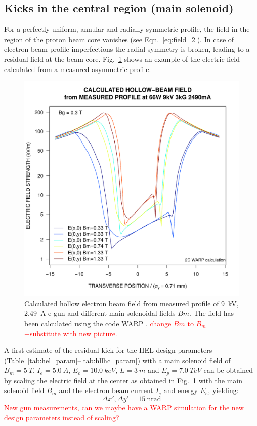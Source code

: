 \documentclass[%
 reprint,
 amsmath,amssymb,
 aps,
prstab,
]{revtex4-1}
\newcommand{\q}[2]{\ensuremath{#1\ \mathrm{#2}}} %
\begin{document}
\subsection{Kicks in the central region (main solenoid)}
\label{core:sec:2}
For a perfectly uniform, annular and radially symmetric profile, the field in the region of the proton beam core vanishes (see Eqn.~\ref{eq:field_2}). In case of electron beam profile imperfections the radial symmetry is broken, leading to a residual field at the beam core. Fig.~\ref{core:fig:1} shows an example of the electric field calculated from a measured asymmetric profile.
\begin{figure}[h]
	\centering
	\includegraphics[width=1.0\linewidth]{e-beam_profile.png}
	\caption{Calculated hollow electron beam field from measured profile of 9~kV, 2.49~A e-gun and different main solenoidal fields $Bm$. The field has been calculated using the code WARP \cite{warp}. \textcolor{red}{change $Bm$ to $B_m$ +substitute with new picture.}}
	\label{core:fig:1}
\end{figure}
A first estimate of the residual kick for the HEL design parameters (Table~\ref{tab:hel_param}--\ref{tab:hllhc_param}) with a main solenoid field of $B_{m}=\SI{5}{T}$, $I_e=\SI{5.0}{A}$, $E_{e} = \SI{10.0}{keV}$, $L=\SI{3}{m}$ and $E_{p} = \SI{7.0}{TeV}$ can be obtained by scaling the electric field at the center as obtained in Fig.~\ref{core:fig:1} with the main solenoid field $B_{m}$ and the electron beam current $I_e$ and energy $E_{e}$, yielding:
\begin{equation}\label{eqn:kick_central}
\Delta x', \Delta y'=\q{15}{nrad}
\end{equation}
\textcolor{red}{New gun measurements, can we maybe have a WARP simulation for the new design parameters instead of scaling?}
\end{document}
